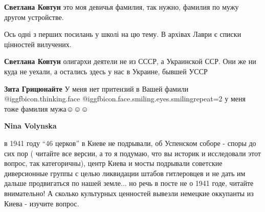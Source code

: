 \begin{itemize}
\begin{itemize}
\begin{itemize}
\textbf{Светлана Ковтун} это моя девичья фамилия, так нужно, фамилия по мужу другом устройстве.

Ось одні з перших посилань у школі на цю тему.
В архівах Лаври є списки цінностей вилучених.

\textbf{Светлана Ковтун} олигархи деятели не из СССР, а Украинской ССР. Они же ни куда не уехали, а остались здесь у нас в Украине, бывшей УССР

\textbf{Зита Грицюнайте}
У меня нет притензий в Вашей фамили  @igg{fbicon.thinking.face}  @igg{fbicon.face.smiling.eyes.smiling}{repeat=2} у меня тоже фамилия мужа☺☺☺

\end{itemize} %

\textbf{Nina Volynska} 

в 1941 году \enquote{46 церков} в Киеве не подрывали, об Успенском соборе - споры до сих
пор ( читайте все версии, а то я подумаю, что вы историк и исследовали этот
вопрос, так категоричны), центр Киева и мосты подрывали советские диверсионные
группы с целью ликвидации штабов гитлеровцев и не дать им дальше продвигаться
по нашей земле... но речь в посте не о 1941 годе, читайте внимательно! А сколько
культурных ценностей вывезли немецкие оккупанты из Киева - изучите вопрос.

\end{itemize} %

\end{itemize} %
